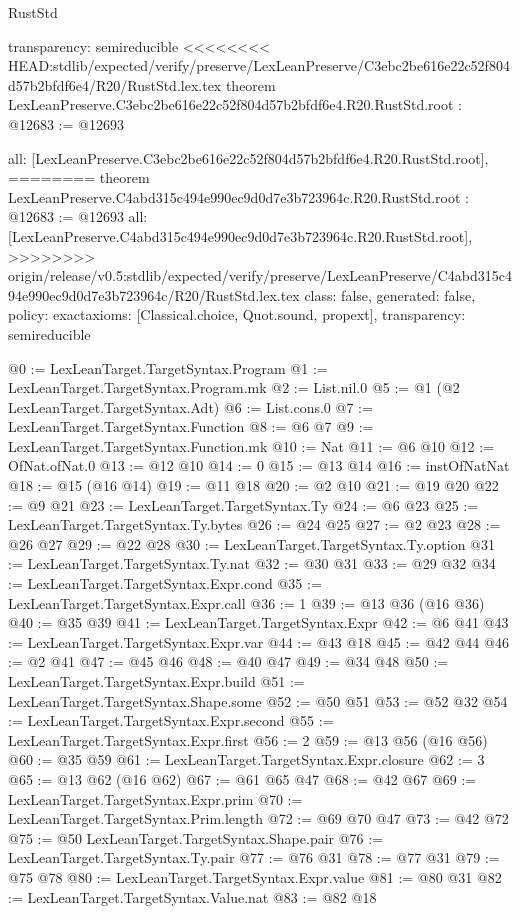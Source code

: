 \begin{lexlean}{RustStd}
\begin{coremodule}
{\begin{coremodule}
{{{{{{{{{{{{{{  transparency: semireducible
}
<<<<<<<< HEAD:stdlib/expected/verify/preserve/LexLeanPreserve/C3ebc2be616e22c52f804d57b2bfdf6e4/R20/RustStd.lex.tex
theorem LexLeanPreserve.C3ebc2be616e22c52f804d57b2bfdf6e4.R20.RustStd.root : @12683 := @12693 {
  all: [LexLeanPreserve.C3ebc2be616e22c52f804d57b2bfdf6e4.R20.RustStd.root],
========
theorem LexLeanPreserve.C4abd315c494e990ec9d0d7e3b723964c.R20.RustStd.root : @12683 := @12693 {
  all: [LexLeanPreserve.C4abd315c494e990ec9d0d7e3b723964c.R20.RustStd.root],
>>>>>>>> origin/release/v0.5:stdlib/expected/verify/preserve/LexLeanPreserve/C4abd315c494e990ec9d0d7e3b723964c/R20/RustStd.lex.tex
  class: false,
  generated: false,
  policy: exact{axioms: [Classical.choice, Quot.sound, propext]},
  transparency: semireducible
}

@0 := LexLeanTarget.TargetSyntax.Program
@1 := LexLeanTarget.TargetSyntax.Program.mk
@2 := List.nil.{0}
@5 := @1 (@2 LexLeanTarget.TargetSyntax.Adt)
@6 := List.cons.{0}
@7 := LexLeanTarget.TargetSyntax.Function
@8 := @6 @7
@9 := LexLeanTarget.TargetSyntax.Function.mk
@10 := Nat
@11 := @6 @10
@12 := OfNat.ofNat.{0}
@13 := @12 @10
@14 := 0
@15 := @13 @14
@16 := instOfNatNat
@18 := @15 (@16 @14)
@19 := @11 @18
@20 := @2 @10
@21 := @19 @20
@22 := @9 @21
@23 := LexLeanTarget.TargetSyntax.Ty
@24 := @6 @23
@25 := LexLeanTarget.TargetSyntax.Ty.bytes
@26 := @24 @25
@27 := @2 @23
@28 := @26 @27
@29 := @22 @28
@30 := LexLeanTarget.TargetSyntax.Ty.option
@31 := LexLeanTarget.TargetSyntax.Ty.nat
@32 := @30 @31
@33 := @29 @32
@34 := LexLeanTarget.TargetSyntax.Expr.cond
@35 := LexLeanTarget.TargetSyntax.Expr.call
@36 := 1
@39 := @13 @36 (@16 @36)
@40 := @35 @39
@41 := LexLeanTarget.TargetSyntax.Expr
@42 := @6 @41
@43 := LexLeanTarget.TargetSyntax.Expr.var
@44 := @43 @18
@45 := @42 @44
@46 := @2 @41
@47 := @45 @46
@48 := @40 @47
@49 := @34 @48
@50 := LexLeanTarget.TargetSyntax.Expr.build
@51 := LexLeanTarget.TargetSyntax.Shape.some
@52 := @50 @51
@53 := @52 @32
@54 := LexLeanTarget.TargetSyntax.Expr.second
@55 := LexLeanTarget.TargetSyntax.Expr.first
@56 := 2
@59 := @13 @56 (@16 @56)
@60 := @35 @59
@61 := LexLeanTarget.TargetSyntax.Expr.closure
@62 := 3
@65 := @13 @62 (@16 @62)
@67 := @61 @65 @47
@68 := @42 @67
@69 := LexLeanTarget.TargetSyntax.Expr.prim
@70 := LexLeanTarget.TargetSyntax.Prim.length
@72 := @69 @70 @47
@73 := @42 @72
@75 := @50 LexLeanTarget.TargetSyntax.Shape.pair
@76 := LexLeanTarget.TargetSyntax.Ty.pair
@77 := @76 @31
@78 := @77 @31
@79 := @75 @78
@80 := LexLeanTarget.TargetSyntax.Expr.value
@81 := @80 @31
@82 := LexLeanTarget.TargetSyntax.Value.nat
@83 := @82 @18
}}}}}}}}}}}}}}
\end{coremodule}}
\end{coremodule}
\end{lexlean}
